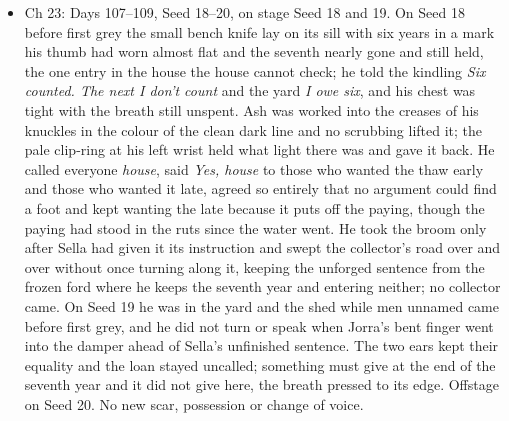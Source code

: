 \documentclass{design/chronicle}
\begin{document}
{\begin{itemize}[leftmargin=1.4em,itemsep=1pt,topsep=3pt,parsep=0pt]
\item Ch 23: Days 107–109, Seed 18–20, on stage Seed 18 and 19. On Seed 18 before first grey the small bench knife lay on its sill with six years in a mark his thumb had worn almost flat and the seventh nearly gone and still held, the one entry in the house the house cannot check; he told the kindling \emph{Six counted. The next I don’t count} and the yard \emph{I owe six}, and his chest was tight with the breath still unspent. Ash was worked into the creases of his knuckles in the colour of the clean dark line and no scrubbing lifted it; the pale clip-ring at his left wrist held what light there was and gave it back. He called everyone \emph{house}, said \emph{Yes, house} to those who wanted the thaw early and those who wanted it late, agreed so entirely that no argument could find a foot and kept wanting the late because it puts off the paying, though the paying had stood in the ruts since the water went. He took the broom only after Sella had given it its instruction and swept the collector’s road over and over without once turning along it, keeping the unforged sentence from the frozen ford where he keeps the seventh year and entering neither; no collector came. On Seed 19 he was in the yard and the shed while men unnamed came before first grey, and he did not turn or speak when Jorra’s bent finger went into the damper ahead of Sella’s unfinished sentence. The two ears kept their equality and the loan stayed uncalled; something must give at the end of the seventh year and it did not give here, the breath pressed to its edge. Offstage on Seed 20. No new scar, possession or change of voice.

\end{itemize}

\begin{itemize}[leftmargin=1.4em,itemsep=1pt,topsep=3pt,parsep=0pt]


\end{itemize}}
\end{document}
